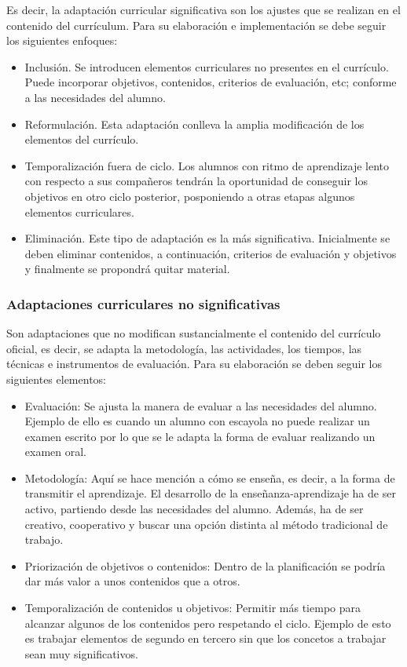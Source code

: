 Es decir, la adaptación curricular significativa son los ajustes que se realizan en el contenido del currículum. Para su elaboración e implementación se debe seguir los siguientes enfoques:
\begin{itemize}
    \item Inclusión. Se introducen elementos curriculares no presentes en el currículo. Puede incorporar objetivos, contenidos, criterios de evaluación, etc; conforme a las necesidades del alumno.
    \item Reformulación. Esta adaptación conlleva la amplia modificación de los elementos del currículo.
    \item Temporalización fuera de ciclo. Los alumnos con ritmo de aprendizaje lento con respecto a sus compañeros tendrán la oportunidad de conseguir los objetivos en otro ciclo posterior, posponiendo a otras etapas algunos elementos curriculares.
    \item Eliminación. Este tipo de adaptación es la más significativa. Inicialmente se deben eliminar contenidos, a continuación, criterios de evaluación y objetivos y finalmente se propondrá quitar material.
\end{itemize}

\subsubsection{Adaptaciones curriculares no significativas}
Son adaptaciones que no modifican sustancialmente el contenido del currículo oficial, es decir, se adapta la metodología, las actividades, los tiempos, las técnicas e instrumentos de evaluación. Para su elaboración se deben seguir los siguientes elementos:
\begin{itemize}
    \item Evaluación: Se ajusta la manera de evaluar a las necesidades del alumno. Ejemplo de ello es cuando un alumno con escayola no puede realizar un examen escrito por lo que se le adapta la forma de evaluar realizando un examen oral.
    \item Metodología: Aquí se hace mención a cómo se enseña, es decir, a la forma de transmitir el aprendizaje. El desarrollo de la enseñanza-aprendizaje ha de ser activo, partiendo desde las necesidades del alumno. Además, ha de ser creativo, cooperativo y buscar una opción distinta al método tradicional de trabajo.
    \item Priorización de objetivos o contenidos: Dentro de la planificación se podría dar más valor a unos contenidos que a otros.
    \item Temporalización de contenidos u objetivos: Permitir más tiempo para alcanzar algunos de los contenidos pero respetando el ciclo. Ejemplo de esto es trabajar elementos de segundo en tercero sin que los concetos a trabajar sean muy significativos.
\end{itemize}

